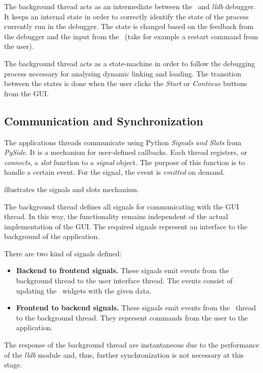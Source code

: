 The background thread acts as an intermediate between the \gui\ and \textit{lldb} debugger. It keeps an internal state in order to correctly identify the state of the process currently run in the debugger. The state is changed based on the feedback from the debugger and the input from the \gui\ (take for example a restart command from the user).

The background thread acts as a state-machine in order to follow the debugging process necessary for analysing dynamic linking and loading. The transition between the states is done when the user clicks the \textit{Start} or \textit{Continue} buttons from the GUI.

\subsection{Communication and Synchronization}
\label{sub-sec:comm-sync-implem}

The applications threads communicate using Python \textit{Signals and Slots} from \textit{PySide}. It is a mechanism for user-defined callbacks. Each thread registers, or \textit{connects}, a \textit{slot} function to a \textit{signal} object. The purpose of this function is to handle a certain event. For the signal, the event is \textit{emitted} on demand.

 illustrates the signals and slots mechanism.

The background thread defines all signals for communicating with the GUI thread. In this way, the functionality remains independent of the actual implementation of the GUI. The required signals represent an interface to the background of the application.

There are two kind of signals defined:
\begin{itemize}
\item \textbf{Backend to frontend signals.} These signals emit events from the background thread to the user interface thread. The events consist of updating the \gui\ widgets with the given data.
\item \textbf{Frontend to backend signals.} These signals emit events from the \gui\ thread to the background thread. They represent commands from the user to the application.
\end{itemize}

The response of the background thread are instantaneous due to the performance of the \textit{lldb} module and, thus, further synchronization is not necessary at this stage.

